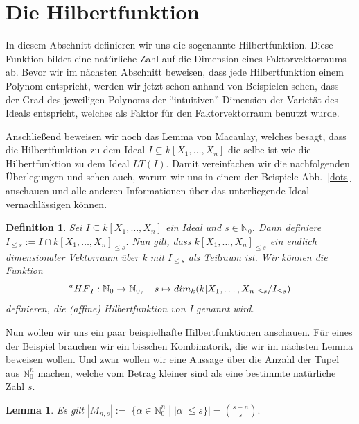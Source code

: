 \documentclass{article}
\newtheorem{definition}[satz]{Definition}
\newtheorem{lemma}[satz]{Lemma}
\newcommand*{\R}{k[X_{1},\ldots,X_{n}]}
\begin{document}
\section{Die Hilbertfunktion}

	In diesem Abschnitt definieren wir uns die sogenannte Hilbertfunktion. Diese Funktion bildet eine natürliche Zahl auf die Dimension eines Faktorvektorraums ab. Bevor wir im nächsten Abschnitt beweisen, dass jede Hilbertfunktion einem Polynom entspricht, werden wir jetzt schon anhand von Beispielen sehen, dass der Grad des jeweiligen Polynoms der ``intuitiven'' Dimension der Varietät des Ideals entspricht, welches als Faktor für den Faktorvektorraum benutzt wurde.
	
	Anschließend beweisen wir noch das Lemma von Macaulay, welches besagt, dass die Hilbertfunktion zu dem Ideal \(I \subseteq \R\) die selbe ist wie die Hilbertfunktion zu dem Ideal \(LT(I)\). Damit vereinfachen wir die nachfolgenden Überlegungen und sehen auch, warum wir uns in einem der Beispiele Abb.~\ref{dots} anschauen und alle anderen Informationen über das unterliegende Ideal vernachlässigen können.
	
	\begin{definition} \label{1.2.11}
	Sei \(I \subseteq \R\) ein Ideal und \(s \in \mathbb{N}_{0}\). Dann definiere \(I_{\leq s} :=
	I \cap \R_{\leq s}\). Nun gilt, dass \(\R_{\leq s}\) ein endlich dimensionaler Vektorraum über
	k  mit \(I_{\leq s}\) als Teilraum ist. Wir können die Funktion \begin{displaymath}
	\prescript{a}{}{HF}_{I} : \mathbb{N}_{0} \rightarrow \mathbb{N}_{0}, \quad s \mapsto
	dim_{k}(\R_{\leq s}/I_{\leq s})	\end{displaymath} definieren, die (affine) Hilbertfunktion
	von I genannt wird.
	\end{definition}

	Nun wollen wir uns ein paar beispielhafte Hilbertfunktionen anschauen. Für eines der Beispiel brauchen wir ein bisschen Kombinatorik, die wir im nächsten Lemma beweisen wollen. Und zwar wollen wir eine Aussage über die Anzahl der Tupel aus \(\mathbb{N}^n_0\) machen, welche vom Betrag kleiner sind als eine bestimmte natürliche Zahl \(s\).
	
	\begin{lemma}\label{kombinatorik}
	Es gilt \(|M_{n,s}| := |\{\alpha \in \mathbb{N}^{n}_{0}\; |\; |\alpha| \leq s \}| = \binom{s + n}{s}. \)
	\end{lemma}
\end{document}
